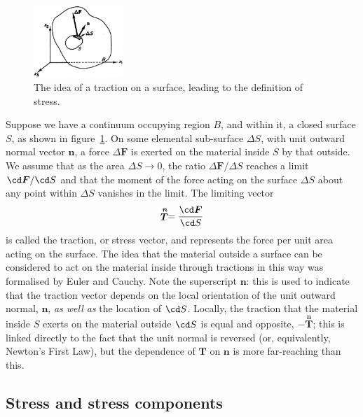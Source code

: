 \documentclass[twoside,11pt]		{report}
\begin{document}
\begin{figure}
\begin{center}
\includegraphics[width=0.30\textwidth]{Fung-3.1.eps}
\end{center}
\caption{The idea of a traction on a surface, leading to the
  definition of stress. \citep[After][]{fung69}}
\label{fig.tract}
\end{figure}

Suppose we have a continuum occupying region $B$, and within it, a
closed surface $S$, as shown in figure~\ref{fig.tract}. On some
elemental sub-surface $\Delta S$, with unit outward normal vector
$\bm{n}$, a force $\Delta\bm{F}$ is exerted on the material inside $S$
by that outside. We assume that as the area $\Delta S\to0$, the ratio
$\Delta\bm{F}/\Delta S$ reaches a limit $\cd\bm{F}/\cd S$ and that the
moment of the force acting on the surface $\Delta S$ about any point
within $\Delta S$ vanishes in the limit.  The limiting vector 
\begin{equation}
\stackrel{\bm{n}}{\bm{T}}=\frac{\cd\bm{F}}{\cd S}
\end{equation}
is called the traction, or stress vector, and represents the force per
unit area acting on the surface.  The idea that the material outside a
surface can be considered to act on the material inside through
tractions in this way was formalised by Euler and Cauchy.  Note the
superscript $\bm{n}$: this is used to indicate that the traction
vector depends on the local orientation of the unit outward normal,
$\bm{n}$, \emph{as well as} the location of $\cd S$. Locally, the
traction that the material inside $S$ exerts on the material outside
$\cd S$ is equal and opposite, \ie $-\stackrel{\bm{n}}{\bm{T}}$; this
is linked directly to the fact that the unit normal is reversed (or,
equivalently, Newton's First Law), but the dependence of $\bm{T}$ on
$\bm{n}$ is more far-reaching than this.

\subsection{Stress and stress components}
\end{document}
